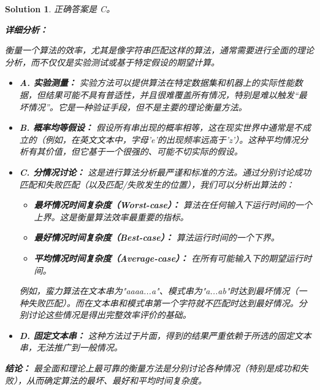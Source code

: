 \documentclass[UTF8]{report}
\newtheorem{solution}{Solution}
\theoremstyle{MyLineTheoremStyle} %
\theoremstyle{MyBlockTheoremStyle} %
\theoremstyle{MySubsubsectionStyle} %
\begin{document}
\begin{solution}
正确答案是 C。

\textbf{详细分析：}

衡量一个算法的效率，尤其是像字符串匹配这样的算法，通常需要进行全面的理论分析，而不仅仅是实验测试或基于特定假设的期望计算。

\begin{itemize}
    \item \textbf{A. 实验测量：} 实验方法可以提供算法在特定数据集和机器上的实际性能数据，但结果可能不具有普适性，并且很难覆盖所有情况，特别是难以触发“最坏情况”。它是一种验证手段，但不是主要的理论衡量方法。

    \item \textbf{B. 概率均等假设：} 假设所有串出现的概率相等，这在现实世界中通常是不成立的（例如，在英文文本中，字母'e'的出现频率远高于'z'）。这种平均情况分析有其价值，但它基于一个很强的、可能不切实际的假设。

    \item \textbf{C. 分情况讨论：} 这是进行算法分析最严谨和标准的方法。通过分别讨论成功匹配和失败匹配（以及匹配/失败发生的位置），我们可以分析出算法的：
    \begin{itemize}
        \item \textbf{最坏情况时间复杂度（Worst-case）：} 算法在任何输入下运行时间的一个上界。这是衡量算法效率最重要的指标。
        \item \textbf{最好情况时间复杂度（Best-case）：} 算法运行时间的一个下界。
        \item \textbf{平均情况时间复杂度（Average-case）：} 在所有可能输入下的期望运行时间。
    \end{itemize}
    例如，蛮力算法在文本串为"aaaa...a"、模式串为"a...ab"时达到最坏情况（一种失败匹配）。而在文本串和模式串第一个字符就不匹配时达到最好情况。分别讨论这些情况是得出完整效率评价的基础。

    \item \textbf{D. 固定文本串：} 这种方法过于片面，得到的结果严重依赖于所选的固定文本串，无法推广到一般情况。
\end{itemize}

\textbf{结论：}
最全面和理论上最可靠的衡量方法是分别讨论各种情况（特别是成功和失败），从而确定算法的最坏、最好和平均时间复杂度。
\end{solution}
\end{document}
